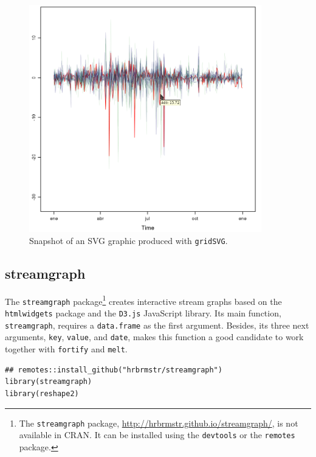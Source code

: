 \documentclass[smallroyalvopaper]{memoir}
\begin{document}
\begin{figure}
  \centering
  \includegraphics[width=0.9\textwidth]{figs/navarraSVG_captura.png}
  \caption{\label{fig:navarraSVG}Snapshot of an SVG graphic produced with \texttt{gridSVG}.}
\end{figure}

\subsection{streamgraph \label{sec:interactive_streamgraph}}
\label{sec:org3cf8855}

The \texttt{streamgraph} package\footnote{The \texttt{streamgraph} package, \url{http://hrbrmstr.github.io/streamgraph/}, is not available in CRAN. It can be installed using the \texttt{devtools} or the \texttt{remotes} package.} creates interactive stream graphs based on
the \texttt{htmlwidgets} package and the \texttt{D3.js} JavaScript library. Its main
function, \texttt{streamgraph}, requires a \texttt{data.frame} as the first
argument. Besides, its three next arguments, \texttt{key}, \texttt{value}, and
\texttt{date}, makes this function a good candidate to work together with
\texttt{fortify} and \texttt{melt}.

\lstset{language=r,label= ,caption= ,captionpos=b,numbers=none}
\begin{lstlisting}
## remotes::install_github("hrbrmstr/streamgraph")
library(streamgraph)
library(reshape2)
\end{lstlisting}
\end{document}
